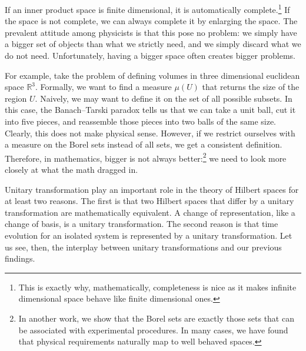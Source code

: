 \documentclass[10pt,twocolumn, nofootinbib]{revtex4-2}
\begin{document}
If an inner product space is finite dimensional, it is automatically complete.\footnote{This is exactly why, mathematically, completeness is nice as it makes infinite dimensional space behave like finite dimensional ones.} If the space is not complete, we can always complete it by enlarging the space. The prevalent attitude among physicists is that this pose no problem: we simply have a bigger set of objects than what we strictly need, and we simply discard what we do not need. Unfortunately, having a bigger space often creates bigger problems.

For example, take the problem of defining volumes in three dimensional euclidean space $\mathbb{R}^3$. Formally, we want to find a measure $\mu(U)$ that returns the size of the region $U$. Naively, we may want to define it on the set of all possible subsets. In this case, the Banach–Tarski paradox tells us that we can take a unit ball, cut it into five pieces, and reassemble those pieces into two balls of the same size. Clearly, this does not make physical sense. However, if we restrict ourselves with a measure on the Borel sets instead of all sets, we get a consistent definition. Therefore, in mathematics, bigger is not always better:\footnote{In another work, we show that the Borel sets are exactly those sets that can be associated with experimental procedures. In many cases, we have found that physical requirements naturally map to well behaved spaces.} we need to look more closely at what the math dragged in.

Unitary transformation play an important role in the theory of Hilbert spaces for at least two reasons. The first is that two Hilbert spaces that differ by a unitary transformation are mathematically equivalent. A change of representation, like a change of basis, is a unitary transformation. The second reason is that time evolution for an isolated system is represented by a unitary transformation. Let us see, then, the interplay between unitary transformations and our previous findings.
\end{document}
